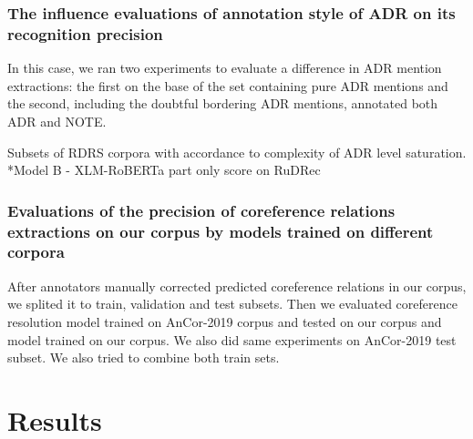 \documentclass[a4paper,fleqn,longmktitle]{cas-dc}
\begin{document}
  \subsubsection{The influence evaluations of annotation style of ADR on its recognition precision}%
  In this case, we ran two experiments to evaluate a difference in  ADR mention extractions: the first on the base of the set containing pure  ADR mentions and the second, including the doubtful bordering ADR mentions, annotated both ADR and NOTE.
  
\begin{table*}
\centering
\caption{Subsets of RDRS corpora with accordance to complexity of ADR level saturation. *Model B - XLM-RoBERTa part only score on RuDRec}

\label{tab:rdrs_subsets}
\end{table*}

 \subsubsection{Evaluations of the precision of coreference  relations extractions on our corpus by models  trained on different corpora} After  annotators  manually  corrected  predicted coreference relations in our corpus, we splited it to train, validation and test subsets. Then we evaluated coreference resolution model trained on AnCor-2019 corpus and tested on our corpus and model trained on our corpus.  We also did same experiments on AnCor-2019 test subset. We also tried to combine both train sets.%
  

\section{Results}\label{sec:results}
\end{document}
